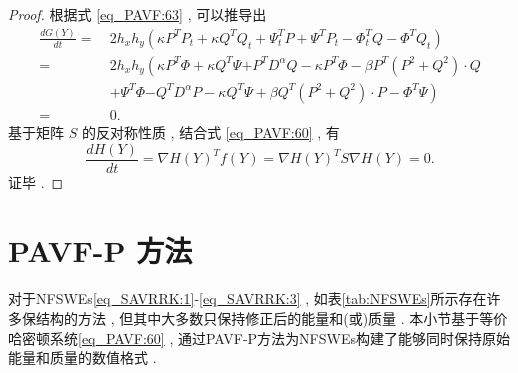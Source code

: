 \begin{proof}
	根据式 \eqref{eq_PAVF:63} , 可以推导出
	\begin{align}\label{eq_PAVF:64}
		\frac{d G(Y)}{d t}=&~2 h_{x} h_{y}\left(\kappa P^{T}P_t+\kappa Q^{T}Q_t+\Psi^{T}_t P+\Psi^{T}P_{t}-\varPhi^{T}_t Q-\varPhi^{T}Q_{t}\right)\nonumber\\
		=&~2 h_{x} h_{y}\left(\kappa P^{T}\varPhi+\kappa Q^{T}\Psi {+ P^{T}D^{\alpha}Q}-\kappa P^{T}\varPhi-\beta P^{T}\left( P^{2}+Q^{2}\right)\cdot Q\right . \nonumber\\
		&~\left . +\Psi^{T}\varPhi{-Q^{T}D^{\alpha}P}-\kappa Q^{T}\Psi+\beta Q^{T}\left( P^{2}+Q^{2}\right)\cdot P-\varPhi^{T}\Psi\right)\nonumber\\
		=&~0 . 
		\end{align}
		基于矩阵 $S$ 的反对称性质 , 结合式 \eqref{eq_PAVF:60} , 有
		\begin{equation}\label{eq_PAVF:65}
		\frac{d H(Y)}{d t}=\nabla H(Y)^{T} f(Y)=\nabla H(Y)^{T} S \nabla H(Y)=0  . 
		\end{equation}
		证毕 . 
		\end{proof}

\section{PAVF-P 方法}\label{Section_PAVF: 3}
对于NFSWEs\eqref{eq_SAVRRK:1}-\eqref{eq_SAVRRK:3} , 如表\ref{tab:NFSWEs}所示存在许多保结构的方法 , 但其中大多数只保持修正后的能量和(或)质量 . 
本小节基于等价哈密顿系统\eqref{eq_PAVF:60} , 通过PAVF-P方法\cite{caiPartitionedAveragedVector2018}为NFSWEs构建了能够同时保持原始能量和质量的数值格式 . 

